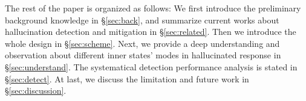 The rest of the paper is organized as follows:
We first introduce the preliminary background knowledge in \S\ref{sec:back}, and summarize current works about hallucination detection and mitigation in \S\ref{sec:related}.
Then we introduce the whole design in \S\ref{sec:scheme}.
Next, we provide a deep understanding and observation about different inner states' modes in hallucinated response in \S\ref{sec:understand}.
The systematical detection performance analysis is stated in \S\ref{sec:detect}.
At last, we discuss the limitation and future work in \S\ref{sec:discussion}.